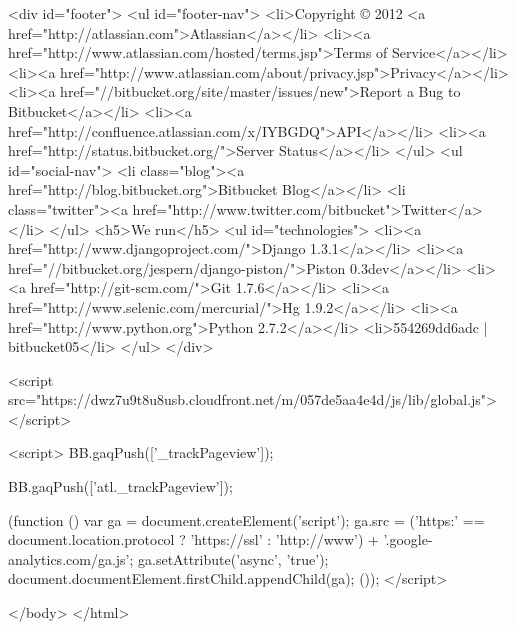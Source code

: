   <div id="footer">
    <ul id="footer-nav">
      <li>Copyright © 2012 <a href="http://atlassian.com">Atlassian</a></li>
      <li><a href="http://www.atlassian.com/hosted/terms.jsp">Terms of Service</a></li>
      <li><a href="http://www.atlassian.com/about/privacy.jsp">Privacy</a></li>
      <li><a href="//bitbucket.org/site/master/issues/new">Report a Bug to Bitbucket</a></li>
      <li><a href="http://confluence.atlassian.com/x/IYBGDQ">API</a></li>
      <li><a href="http://status.bitbucket.org/">Server Status</a></li>
    </ul>
    <ul id="social-nav">
      <li class="blog"><a href="http://blog.bitbucket.org">Bitbucket Blog</a></li>
      <li class="twitter"><a href="http://www.twitter.com/bitbucket">Twitter</a></li>
    </ul>
    <h5>We run</h5>
    <ul id="technologies">
      <li><a href="http://www.djangoproject.com/">Django 1.3.1</a></li>
      <li><a href="//bitbucket.org/jespern/django-piston/">Piston 0.3dev</a></li>
      <li><a href="http://git-scm.com/">Git 1.7.6</a></li>
      <li><a href="http://www.selenic.com/mercurial/">Hg 1.9.2</a></li>
      <li><a href="http://www.python.org">Python 2.7.2</a></li>
      <li>554269dd6adc | bitbucket05</li>
    </ul>
  </div>

  <script src="https://dwz7u9t8u8usb.cloudfront.net/m/057de5aa4e4d/js/lib/global.js"></script>






  <script>
    BB.gaqPush(['_trackPageview']);
  
    BB.gaqPush(['atl._trackPageview']);

    

    

    (function () {
        var ga = document.createElement('script');
        ga.src = ('https:' == document.location.protocol ? 'https://ssl' : 'http://www') + '.google-analytics.com/ga.js';
        ga.setAttribute('async', 'true');
        document.documentElement.firstChild.appendChild(ga);
    }());
  </script>

</body>
</html>
